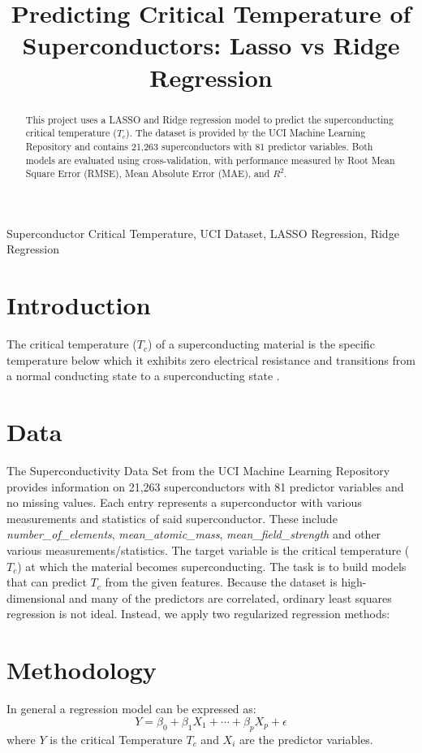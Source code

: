 \documentclass[conference]{IEEEtran}
\title{Predicting Critical Temperature of Superconductors: Lasso vs Ridge Regression}
\author{
  \IEEEauthorblockN{Miguel Ramirez}
  \IEEEauthorblockA{
    Department of Statistics and Data Science \\
    University of Central Florida \\
    Orlando, United States \\
    miramirez@knights.ucf.edu}
}
\begin{document}
\maketitle

\begin{abstract}
This project uses a LASSO and Ridge regression model to predict the superconducting critical temperature ($T_c$). 
The dataset is provided by the UCI Machine Learning Repository and contains 21,263 superconductors with 81 predictor variables. 
Both models are evaluated using cross-validation, with performance measured by Root Mean Square Error (RMSE), Mean Absolute Error (MAE), and $R^2$.
\end{abstract}
\begin{IEEEkeywords}
Superconductor Critical Temperature, UCI Dataset, LASSO Regression, Ridge Regression
\end{IEEEkeywords}

\section*{Introduction}

The critical temperature ($T_c$) of a superconducting material is the specific temperature below which it exhibits zero electrical resistance and transitions from a normal conducting state to a superconducting state \cite{sciencedirect_tc}.

\section{Data}
The Superconductivity Data Set from the UCI Machine Learning Repository provides information on 21,263 superconductors with 81 predictor variables and no missing values. 
Each entry represents a superconductor with various measurements and statistics of said superconductor. These include \emph{number\_of\_elements}, \emph{mean\_atomic\_mass}, \emph{mean\_field\_strength} and other various measurements/statistics. 
The target variable is the critical temperature ($T_c$) at which the material becomes superconducting. 
The task is to build models that can predict $T_c$ from the given features. 
Because the dataset is high-dimensional and many of the predictors are correlated, ordinary least squares regression is not ideal. Instead, we apply two regularized regression methods:

\section{Methodology}
\noindent In general a regression model can be expressed as:
\[
Y = \beta_0 + \beta_1X_1 + \cdots + \beta_pX_p + \epsilon
\]
where $Y$ is the critical Temperature $T_c$ and $X_i$ are the predictor variables.
\end{document}
